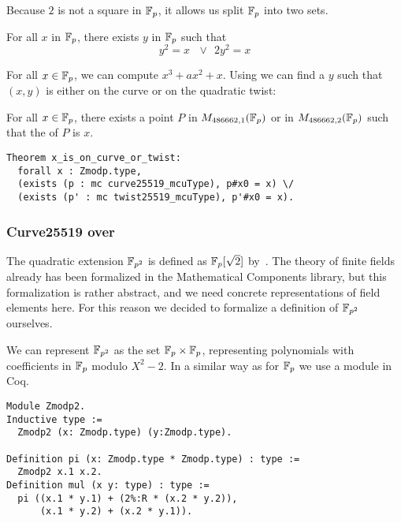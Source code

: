Because $2$ is not a square in $\mathbb{F}_{p}$, it allows us split $\mathbb{F}_{p}$ into two sets.
\begin{lemma}
  \label{lemma:square-or-2square}
  For all $x$ in $\mathbb{F}_{p}$, there exists $y$ in $\mathbb{F}_{p}$ such that
  $$y^2 = x\ \ \ \lor\ \ 2y^2 = x$$
\end{lemma}
For all $x \in \mathbb{F}_{p}$, we can compute $x^3 + ax^2 + x$. Using 
we can find a $y$ such that $(x,y)$ is either on the curve or on the quadratic twist:
\begin{lemma}
  \label{lemma:curve-or-twist}
  For all $x \in \mathbb{F}_{p}$, there exists a point $P$ in $M_{486662,1}(\mathbb{F}_{p})$ or
  in $M_{486662,2}(\mathbb{F}_{p})$ such that the \xcoord of $P$ is $x$.
\end{lemma}
\begin{lstlisting}[language=Coq,belowskip=-0.5 \baselineskip]
Theorem x_is_on_curve_or_twist:
  forall x : Zmodp.type,
  (exists (p : mc curve25519_mcuType), p#x0 = x) \/
  (exists (p' : mc twist25519_mcuType), p'#x0 = x).
\end{lstlisting}

\subsubsection{Curve25519 over }
\label{subsec:curvep2}

The quadratic extension $\mathbb{F}_{p^2}$ is defined as $\mathbb{F}_{p}[\sqrt{2}]$ by~\cite{Ber06}.
The theory of finite fields already has been formalized in the Mathematical Components
library,
but this formalization is rather abstract, and we need concrete representations of field
elements here.
For this reason we decided to formalize a definition of $\mathbb{F}_{p^2}$ ourselves.

We can represent $\mathbb{F}_{p^2}$ as the set $\mathbb{F}_{p} \times \mathbb{F}_{p}$,
representing polynomials with coefficients in $\mathbb{F}_{p}$ modulo $X^2 - 2$. In a similar way
as for $\mathbb{F}_{p}$ we use a module in Coq.
\begin{lstlisting}[language=Coq,belowskip=-0.25 \baselineskip]
Module Zmodp2.
Inductive type :=
  Zmodp2 (x: Zmodp.type) (y:Zmodp.type).

Definition pi (x: Zmodp.type * Zmodp.type) : type :=
  Zmodp2 x.1 x.2.
Definition mul (x y: type) : type :=
  pi ((x.1 * y.1) + (2%:R * (x.2 * y.2)),
      (x.1 * y.2) + (x.2 * y.1)).
\end{lstlisting}

